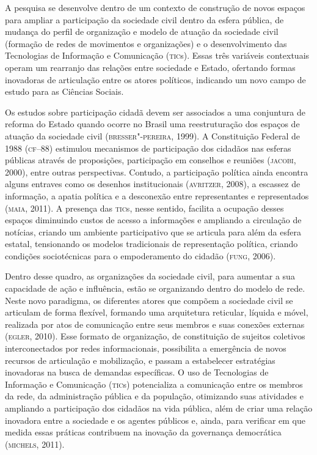A pesquisa se desenvolve dentro de um contexto de construção de novos
espaços para ampliar a participação da sociedade civil dentro da esfera
pública, de mudança do perfil de organização e modelo de atuação da
sociedade civil (formação de redes de movimentos e organizações) e o
desenvolvimento das Tecnologias de Informação e Comunicação (\textsc{tic}s).
Essas três variáveis contextuais operam um rearranjo das relações entre
sociedade e Estado, ofertando formas inovadoras de articulação entre os
atores políticos, indicando um novo campo de estudo para as Ciências
Sociais.

Os estudos sobre participação cidadã devem ser associados a uma
conjuntura de reforma do Estado quando ocorre no Brasil uma
reestruturação dos espaços de atuação da sociedade civil
(\textsc{bresser"-pereira}, 1999). A Constituição Federal de 1988 (\textsc{cf}--88)
estimulou mecanismos de participação dos cidadãos nas esferas públicas
através de proposições, participação em conselhos e reuniões (\textsc{jacobi},
2000), entre outras perspectivas. Contudo, a participação política ainda
encontra alguns entraves como os desenhos institucionais (\textsc{avritzer},
2008), a escassez de informação, a apatia política e a desconexão entre
representantes e representados (\textsc{maia}, 2011). A presença das \textsc{tic}s, nesse
sentido, facilita a ocupação desses espaços diminuindo custos de acesso
a informações e ampliando a circulação de notícias, criando um ambiente
participativo que se articula para além da esfera estatal, tensionando
os modelos tradicionais de representação política, criando condições
sociotécnicas para o empoderamento do cidadão (\textsc{fung}, 2006).

Dentro desse quadro, as organizações da sociedade civil, para aumentar a
sua capacidade de ação e influência, estão se organizando dentro do
modelo de rede. Neste novo paradigma, os diferentes atores que compõem a
sociedade civil se articulam de forma flexível, formando uma arquitetura
reticular, líquida e móvel, realizada por atos de comunicação entre seus
membros e suas conexões externas (\textsc{egler}, 2010). Esse formato de
organização, de constituição de sujeitos coletivos interconectados por
redes informacionais, possibilita a emergência de novos recursos de
articulação e mobilização, e passam a estabelecer estratégias inovadoras
na busca de demandas específicas. O uso de Tecnologias de Informação e
Comunicação (\textsc{tic}s) potencializa a comunicação entre os membros da rede,
da administração pública e da população, otimizando suas atividades e
ampliando a participação dos cidadãos na vida pública, além de criar uma
relação inovadora entre a sociedade e os agentes públicos e, ainda, para
verificar em que medida essas práticas contribuem na inovação da
governança democrática (\textsc{michels}, 2011).

